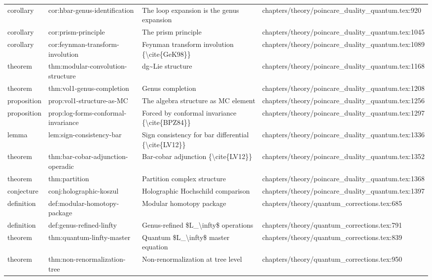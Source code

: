 \documentclass[11pt]{article}
\begin{document}
\begin{longtable}{L{0.10\textwidth}L{0.26\textwidth}L{0.42\textwidth}L{0.22\textwidth}}
corollary & cor:hbar-genus-identification & The loop expansion is the genus expansion & chapters/theory/poincare\_duality\_quantum.tex:920\\
corollary & cor:prism-principle & The prism principle & chapters/theory/poincare\_duality\_quantum.tex:1045\\
corollary & cor:feynman-transform-involution & Feynman transform involution \{\textbackslash{}cite\{GeK98\}\} & chapters/theory/poincare\_duality\_quantum.tex:1089\\
theorem & thm:modular-convolution-structure & dg\textasciitilde{}Lie structure & chapters/theory/poincare\_duality\_quantum.tex:1168\\
theorem & thm:vol1-genus-completion & Genus completion & chapters/theory/poincare\_duality\_quantum.tex:1208\\
proposition & prop:vol1-structure-as-MC & The algebra structure as MC element & chapters/theory/poincare\_duality\_quantum.tex:1256\\
proposition & prop:log-forms-conformal-invariance & Forced by conformal invariance \{\textbackslash{}cite\{BPZ84\}\} & chapters/theory/poincare\_duality\_quantum.tex:1297\\
lemma & lem:sign-consistency-bar & Sign consistency for bar differential \{\textbackslash{}cite\{LV12\}\} & chapters/theory/poincare\_duality\_quantum.tex:1336\\
theorem & thm:bar-cobar-adjunction-operadic & Bar-cobar adjunction \{\textbackslash{}cite\{LV12\}\} & chapters/theory/poincare\_duality\_quantum.tex:1352\\
theorem & thm:partition & Partition complex structure & chapters/theory/poincare\_duality\_quantum.tex:1368\\
conjecture & conj:holographic-koszul & Holographic Hochschild comparison & chapters/theory/poincare\_duality\_quantum.tex:1397\\
definition & def:modular-homotopy-package & Modular homotopy package & chapters/theory/quantum\_corrections.tex:685\\
definition & def:genus-refined-linfty & Genus-refined \$L\_\textbackslash{}infty\$ operations & chapters/theory/quantum\_corrections.tex:791\\
theorem & thm:quantum-linfty-master & Quantum \$L\_\textbackslash{}infty\$ master equation & chapters/theory/quantum\_corrections.tex:839\\
theorem & thm:non-renormalization-tree & Non-renormalization at tree level & chapters/theory/quantum\_corrections.tex:950\\

\end{longtable}
\end{document}
